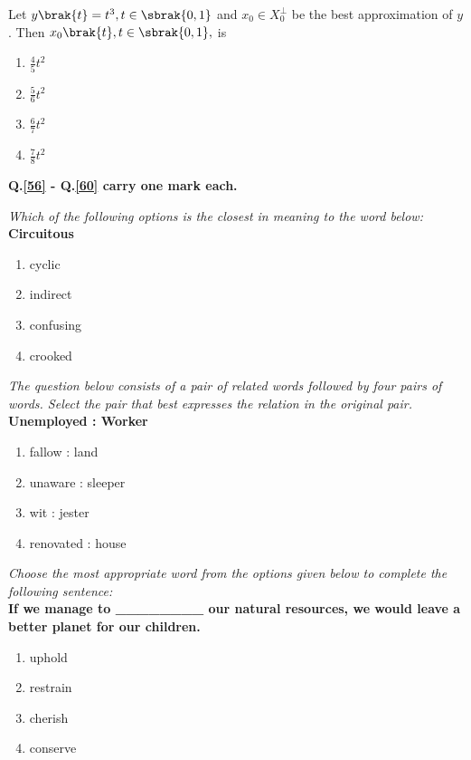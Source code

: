     \item \label{qnum55} Let $y\brak{t} = t^3, t \in \sbrak{0,1}$ and $x_0 \in X_0^{\perp}$ be the best approximation of $y$. Then $x_0\brak{t}, t \in \sbrak{0,1},$ is
        \begin{enumerate}
            \item $\frac{4}{5} t^2$
            \item $\frac{5}{6} t^2$
            \item $\frac{6}{7} t^2$
            \item $\frac{7}{8} t^2$
        \end{enumerate}


        \item[] \textbf{Q.\ref{56} - Q.\ref{60} carry one mark each.}

        \item\label{56} \textit{Which of the following options is the closest in meaning to the word below:} \\ \textbf{Circuitous}
            \begin{enumerate}
                \item cyclic
                \item indirect
                \item confusing
                \item crooked
            \end{enumerate}

            \item \textit{The question below consists of a pair of related words followed by four pairs of words. Select the pair that best expresses the relation in the original pair.} \\
            \textbf{Unemployed : Worker}
            \begin{enumerate}
                \item fallow : land
                \item unaware : sleeper
                \item wit : jester
                \item renovated : house
            \end{enumerate}
    
            \item \textit{Choose the most appropriate word from the options given below to complete the following sentence:} \\
            \textbf{If we manage to \_\_\_\_\_\_\_\_ our natural resources, we would leave a better planet for our children.}
            \begin{enumerate}
                \item uphold
                \item restrain
                \item cherish
                \item conserve
            \end{enumerate}

